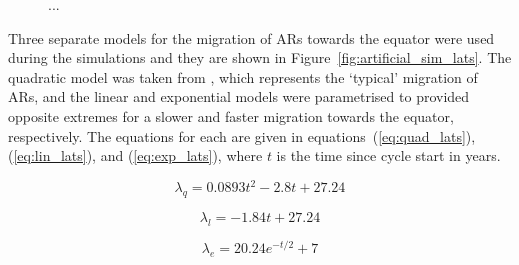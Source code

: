 \begin{figure}[ht!]
	\centering
	\qquad
	\caption{...} 
	\label{fig:KDE_lats}
\end{figure}

Three separate models for the migration of ARs towards the equator were used during the simulations and they are shown in Figure~\ref{fig:artificial_sim_lats}. The quadratic model was taken from \citet{li_latitude_2001}, which represents the `typical' migration of ARs, and the linear and exponential models were parametrised to provided opposite extremes for a slower and faster migration towards the equator, respectively. The equations for each are given in equations~(\ref{eq:quad_lats}), (\ref{eq:lin_lats}), and (\ref{eq:exp_lats}), where $t$ is the time since cycle start in years.

\begin{equation}
\lambda_{q} = 0.0893t^2 - 2.8t + 27.24
\label{eq:quad_lats}
\end{equation}

\begin{equation}
\lambda_{l} = -1.84t + 27.24
\label{eq:lin_lats}
\end{equation}

\begin{equation}
\lambda_{e} = 20.24 e^{-t/2} + 7
\label{eq:exp_lats}
\end{equation}


